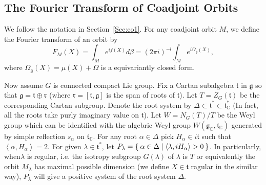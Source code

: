 \documentclass[11pt]{amsart}
\def\bC{{\mathbb{C}}}
\def\fgg{{\mathfrak{g}}}
\def\ftt{{\mathfrak{t}}}
\def\frr{{\mathfrak{r}}}
\def\inn#1#2{\left<{#1},{#2}\right>}
\begin{document}
\subsection{The Fourier Transform of Coadjoint Orbits}
We follow the notation in Section~\ref{Sec:co1}.
For any coadjoint orbit $M$, we define the Fourier transform of an orbit
by 
\[
F_M(X) = \int_M e^{i f(X)}d\beta = (2\pi i )^{-l}\int_Me^{i\Omega_\fgg(X)}, 
\]
where $\Omega_\fgg(X) = \mu(X) + \Omega$ is a equivariantly closed form.

Now assume $G$ is connected compact Lie group.
Fix a Cartan subalgebra $\ftt$ in $\fgg$ so that $\fgg=\ftt\oplus \frr$ (where $\frr = [\ftt,\fgg]$ is the span of roots of $\ftt$). Let $T = Z_G(\ftt)$ be the corresponding Cartan subgroup. Denote the root system by $\Delta \subset \ftt^* \subset \ftt_\bC^*$ (In fact, all the roots take purly imaginary value on $\ftt$).
Let $W = N_G(T)/T$ be the Weyl group which can be identified with the algebric Weyl group $W(\fgg_\bC,\ftt_\bC)$ generated by simple reflection $s_\alpha$ on $\ftt_\bC$. 
For any root $\alpha\in \Delta$ pick $H_\alpha \in i\ftt$ such that $\inn{\alpha}{H_\alpha}=2$.
For given $\lambda\in\ftt^*$,
let $P_\lambda = \Set{\alpha\in \Delta|\inn{\lambda}{iH_\alpha}>0}$.
In particularly, when$\lambda$ is regular, i.e. 
the isotropy subgroup $G(\lambda)$ of $\lambda$ is $T$ 
or equivalently the orbit $M_\lambda$ has maximal possible dimension (we define $X\in \ftt$ ragular in the similar way), $P_\lambda$ will give a positive system of the root system $\Delta$.
\end{document}
